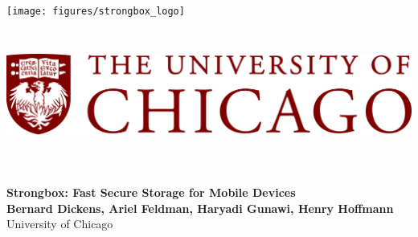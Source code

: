 \documentclass[a0,portrait]{a0poster}
\begin{document}


\begin{minipage}[b]{\linewidth}

\texttt{[image: figures/strongbox\_logo]}\hspace*{0.25cm}
\includegraphics[height=5cm]{figures/uchicago_logo}
\vspace{0.1cm}
\begin{center}
\noindent\makebox[\linewidth]{\rule{0.9\paperwidth}{0.4pt}}
\vspace{0.1cm}
\end{center}

\veryHuge \color{NavyBlue} \textbf{Strongbox: Fast Secure Storage for Mobile Devices} \color{Black}\\[0.5cm] %
\huge \textbf{Bernard Dickens, Ariel Feldman, Haryadi Gunawi, Henry Hoffmann}\\[0.25cm] %
\Large University of Chicago %
\end{minipage}

\vspace{1cm} %

\end{document}
